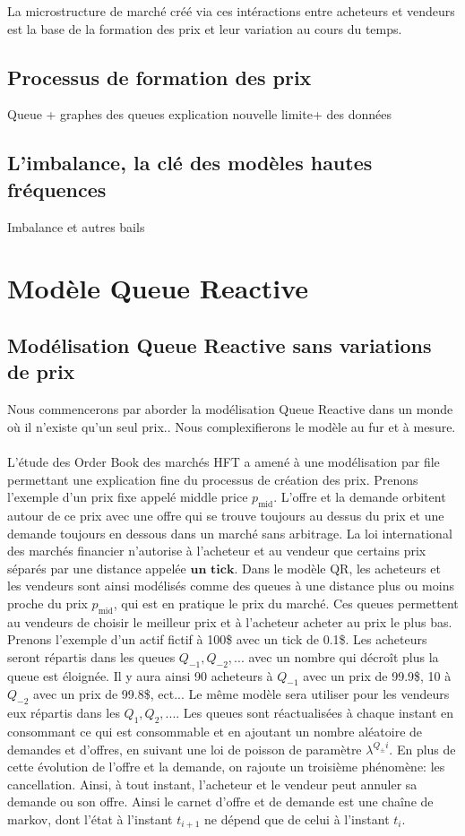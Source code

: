 \documentclass[12pt,a4paper]{article}
\theoremstyle{definition}
\theoremstyle{remark}
\begin{document}
    La microstructure de marché créé via ces intéractions entre acheteurs et vendeurs est la base de la formation des prix et leur variation au cours du temps.

    \subsection{Processus de formation des prix}
    Queue + graphes des queues explication nouvelle limite+ des données

    \subsection{L'imbalance, la clé des modèles hautes fréquences}
    Imbalance et autres bails
    \newpage
    \vspace*{5cm}
    \section{Modèle Queue Reactive}
    \vspace*{2cm}

    \subsection{Modélisation Queue Reactive sans variations de prix}
    Nous commencerons par aborder la modélisation Queue Reactive dans un monde où il n'existe qu'un seul prix.. Nous complexifierons le modèle au fur et à mesure.
    \\
    \\
    L'étude des Order Book des marchés HFT a amené à une modélisation par file permettant une explication fine du processus de création des prix. Prenons l'exemple d'un prix fixe appelé middle price $p_{\text{mid}}$. L'offre et la demande orbitent autour de ce prix avec une offre qui se trouve toujours au dessus du prix et une demande toujours en dessous dans un marché sans arbitrage. La loi international des marchés financier n'autorise à l'acheteur et au vendeur que certains prix séparés par une distance appelée $\textbf{un tick}$. Dans le modèle QR, les acheteurs et les vendeurs sont ainsi modélisés comme des queues à une distance plus ou moins proche du prix $p_{\text{mid}}$, qui est en pratique le prix du marché. Ces queues permettent au vendeurs de choisir le meilleur prix et à l'acheteur acheter au prix le plus bas. Prenons l'exemple d'un actif fictif à 100\$ avec un tick de 0.1\$. Les acheteurs seront répartis dans les queues $Q_{-1},Q_{-2},...$ avec un nombre qui décroît plus la queue est éloignée. Il y aura ainsi 90 acheteurs à $Q_{-1}$ avec un prix de 99.9\$, 10 à $Q_{-2}$ avec un prix de 99.8\$, ect... Le même modèle sera utiliser pour les vendeurs eux répartis dans les $Q_{1},Q_2,...$. Les queues sont réactualisées à chaque instant en consommant ce qui est consommable et en ajoutant un nombre aléatoire de demandes et d'offres, en suivant une loi de poisson de paramètre $\lambda^{Q_\pm i}$. En plus de cette évolution de l'offre et la demande, on rajoute un troisième phénomène: les cancellation. Ainsi, à tout instant, l'acheteur et le vendeur peut annuler sa demande ou son offre. Ainsi le carnet d'offre et de demande est une chaîne de markov, dont l'état à l'instant $t_{i+1}$ ne dépend que de celui à l'instant $t_i$.
\end{document}
